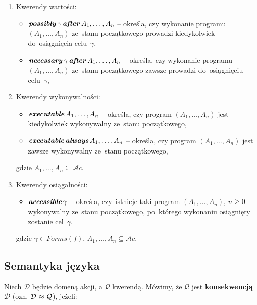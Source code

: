 \documentclass[11pt,a4paper]{article}
\DeclareMathOperator{\After}{\textbf{\textit{after}}}
\DeclareMathOperator{\Always}{\textbf{\textit{always}}}
\DeclareMathOperator{\Executable}{\textbf{\textit{executable}}}
\DeclareMathOperator{\Accessible}{\textbf{\textit{accessible}}}
\DeclareMathOperator{\Possibly}{\textbf{\textit{possibly}}}
\DeclareMathOperator{\Necessary}{\textbf{\textit{necessary}}}
\def\consequence{\mathrel|\joinrel\approx}
\begin{document}
    \begin{enumerate}
        \item Kwerendy wartości:
        \begin{itemize}            
            \item $\Possibly \gamma \After A_1, \dots, A_n$ -- określa, czy wykonanie programu $(A_1, \dots, A_n)$ ze~stanu początkowego prowadzi kiedykolwiek do~osiągnięcia celu~$\gamma$,
            \item $\Necessary \gamma \After A_1, \dots, A_n$ -- określa, czy wykonanie programu $(A_1, \dots, A_n)$ ze~stanu początkowego zawsze prowadzi do~osiągnięciu celu~$\gamma$,
        \end{itemize}
        \item Kwerendy wykonywalności:
        \begin{itemize}
            \item $\Executable A_1, \dots, A_n$ -- określa, czy program $(A_1, \dots, A_n)$ jest kiedykolwiek wykonywalny ze~stanu początkowego,
            \item $\Executable \Always A_1, \dots, A_n$ -- określa, czy program $(A_1, \dots, A_n)$ jest zawsze wykonywalny ze~stanu początkowego,
        \end{itemize}
        gdzie $A_1, \dots, A_n \subseteq \mathcal{A}c$.
        \item Kwerendy osiągalności:
        \begin{itemize}
            \item $\Accessible \gamma$ -- określa, czy~istnieje taki program $(A_1, \dots, A_n)$, $n \geq 0$ wykonywalny ze~stanu początkowego, po~którego wykonaniu osiągnięty zostanie cel~$\gamma$.
        \end{itemize}
        gdzie $\gamma \in Forms(f)$, $A_1, \dots, A_n \subseteq \mathcal{A}c$.
    \end{enumerate}


\subsection{Semantyka języka}

    Niech $\mathcal{D}$ będzie domeną akcji, a $\mathcal{Q}$ kwerendą. %
    Mówimy, że $\mathcal{Q}$ jest \textbf{konsekwencją} $\mathcal{D}$ (ozn. $\mathcal{D} \consequence \mathcal{Q}$), jeżeli:
\end{document}
